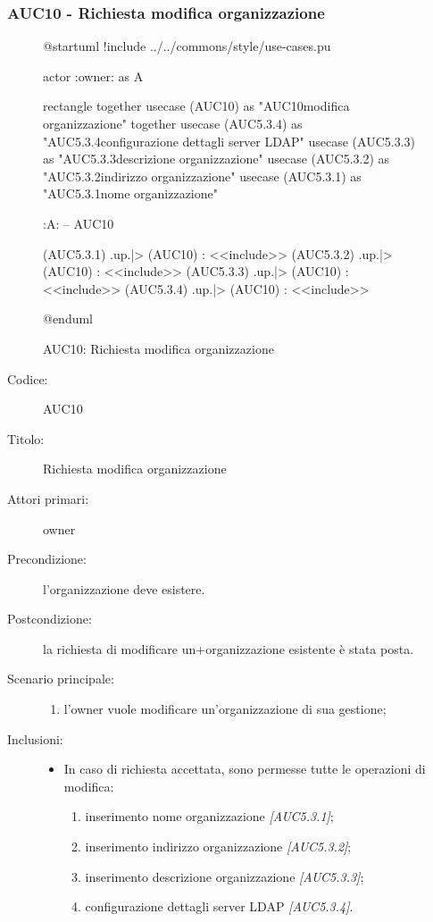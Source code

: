 \documentclass[../analisi-dei-requisiti.tex]{subfiles}
\begin{document}
\subsubsection{AUC10 - Richiesta modifica organizzazione}%
\label{subsub:AUC10}

\begin{figure}[h!]
  \centering
  \begin{plantuml}
  @startuml
  !include ../../commons/style/use-cases.pu

  actor :owner: as A

  rectangle {
    together {
      usecase (AUC10) as "AUC10\nRichiesta modifica organizzazione"
    }
    together {
      usecase (AUC5.3.4) as "AUC5.3.4\nModifica configurazione dettagli server LDAP"
      usecase (AUC5.3.3) as "AUC5.3.3\nModifica descrizione organizzazione"
      usecase (AUC5.3.2) as "AUC5.3.2\nModifica indirizzo organizzazione"
      usecase (AUC5.3.1) as "AUC5.3.1\nModifica nome organizzazione"
    }
  }

  :A: -- AUC10

  (AUC5.3.1) .up.|> (AUC10) : <<include>>
  (AUC5.3.2) .up.|> (AUC10) : <<include>>
  (AUC5.3.3) .up.|> (AUC10) : <<include>>
  (AUC5.3.4) .up.|> (AUC10) : <<include>>

  @enduml
  \end{plantuml}
  \caption{AUC10: Richiesta modifica organizzazione}
  \label{fig:AUC10}
\end{figure}

\begin{description}
  \item[Codice:] AUC10
  \item[Titolo:] Richiesta modifica organizzazione
  \item[Attori primari:] owner
  \item[Precondizione:] l'organizzazione deve esistere.
  \item[Postcondizione:] la richiesta di modificare un+organizzazione esistente è stata posta.
  \item[Scenario principale:]
  \begin{enumerate}
    \item l'owner vuole modificare un'organizzazione di sua gestione;
  \end{enumerate}
  \item[Inclusioni:]
  \begin{itemize}
    \item In caso di richiesta accettata, sono permesse tutte le operazioni di modifica:
    \begin{enumerate}
      \item inserimento nome organizzazione \emph{[AUC5.3.1]};
      \item inserimento indirizzo organizzazione \emph{[AUC5.3.2]};
      \item inserimento descrizione organizzazione \emph{[AUC5.3.3]};
      \item configurazione dettagli server LDAP \emph{[AUC5.3.4]}.
    \end{enumerate}
  \end{itemize}
\end{description}
\end{document}
